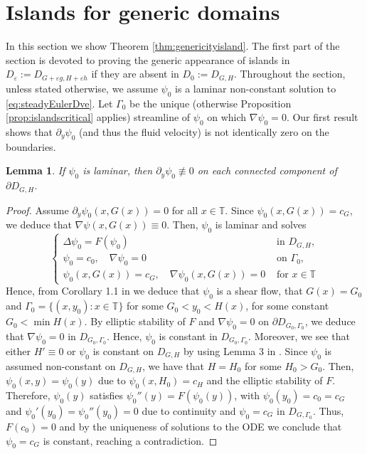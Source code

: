 \documentclass[11pt,reqno]{amsproc}
\newcommand{\ve}{\varepsilon}
\numberwithin{equation}{section}
\numberwithin{theorem}{section}
\numberwithin{prop}{section}
\numberwithin{cor}{section}
\newtheorem{lemma}{Lemma}
\numberwithin{lemma}{section}
\theoremstyle{remark}
\theoremstyle{definition}
\begin{document}
\section{Islands for generic domains}\label{sec:islandgenericdomain}
In this section we show Theorem \ref{thm:genericityisland}. The first part of the section is devoted to proving the generic appearance of islands in $D_\ve := D_{G+\ve g, H+\ve h}$ if they are absent in $D_0:=D_{G,H}$. Throughout the section, unless stated otherwise, we assume $\psi_0$ is a laminar non-constant solution to \eqref{eq:steadyEulerDve}. Let $\Gamma_0$ be the unique (otherwise Proposition \ref{prop:islandscritical} applies) streamline of $\psi_0$ on which $\nabla\psi_0=0$. Our first result shows that $\partial_y\psi_0$ (and thus the fluid velocity) is not identically zero on the boundaries.

\begin{lemma}\label{lemma:nonzerofluidvel}
If $\psi_0$ is laminar, then $\partial_y\psi_0\not\equiv 0$ on each connected component of $\partial D_{G,H}$.
\end{lemma}

\begin{proof}
Assume $\partial_y\psi_0(x,G(x))=0$ for all $x\in \mathbb{T}$. Since $\psi_0(x,G(x))=c_G$, we deduce that $\nabla\psi(x,G(x))\equiv 0$. Then, $\psi_0$ is laminar and solves
\begin{equation}\label{eq:steadyEulerfreebdyDHG}
\begin{cases}
\Delta\psi_0 = F(\psi_0) & \text{ in } D_{G,H}, \\
\psi_0=c_0, \quad \nabla\psi_0=0  & \text{ on } \Gamma_0, \\
\psi_0(x,G(x)) = c_G, \quad \nabla\psi_0(x,G(x))=0 & \text{ for } x\in\mathbb{T}
\end{cases}
\end{equation}
Hence, from Corollary 1.1 in \cite{drivas2024geometric} we deduce that $\psi_0$ is a shear flow, that $G(x)=G_0$ and $\Gamma_0=\lbrace (x,y_0) : x\in \mathbb{T} \rbrace$ for some $G_0<y_0<H(x)$, for some constant $G_0 < \min H(x)$. By elliptic stability of $F$ and $\nabla\psi_0=0$ on $\partial D_{G_0,\Gamma_0}$, we deduce that $\nabla\psi_0=0$ in $D_{G_0,\Gamma_0}$. Hence, $\psi_0$ is constant in $D_{G_0,\Gamma_0}$. Moreover,  we see that either $H'\equiv 0$ or $\psi_0$ is constant on $D_{G,H}$ by using Lemma 3 in \cite{drivas2024islands}. Since $\psi_0$ is assumed non-constant on $D_{G,H}$, we have that $H=H_0$ for some $H_0>G_0$. Then, $\psi_0(x,y) = \psi_0(y)$ due to $\psi_0(x,H_0)=c_H$ and the elliptic stability of $F$. Therefore, $\psi_0(y)$ satisfies $\psi_0''(y)=F(\psi_0(y))$, with $\psi_0(y_0)=c_0=c_G$ and $\psi_0'(y_0)=\psi_0''(y_0)=0$ due to continuity and $\psi_0=c_G$ in $D_{G,\Gamma_0}$. Thus, $F(c_0)=0$ and by the uniqueness of solutions to the ODE we conclude that $\psi_0=c_G$ is constant, reaching a contradiction.
\end{proof}
\end{document}
